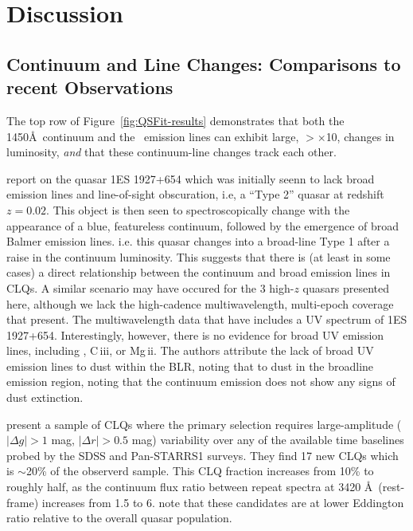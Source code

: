 \documentclass[fleqn,usenatbib]{mnras}
\begin{document}
\section{Discussion}
\subsection{Continuum and Line Changes: Comparisons to recent Observations}
The top row of Figure~\ref{fig:QSFit-results} demonstrates that
both the 1450\AA\ continuum and the \civ\ emission lines can
exhibit large, $>$$\times$10, changes in luminosity, {\it and}
that these continuum-line changes track each other. 

\citet{Trakhtenbrot2019} report on the quasar 1ES 1927+654 which was
initially seenn to lack broad emission lines and line-of-sight
obscuration, i.e, a ``Type 2'' quasar at redshift $z=0.02$. This
object is then seen to spectroscopically change with the appearance of
a blue, featureless continuum, followed by the emergence of broad
Balmer emission lines.  i.e. this quasar changes into a broad-line
Type 1 after a raise in the continuum luminosity.  This suggests that
there is (at least in some cases) a direct relationship between the continuum
and broad emission lines in CLQs.  A similar scenario may have occured
for the 3 high-$z$ quasars presented here, although we lack the
high-cadence multiwavelength, multi-epoch coverage that
\citet{Trakhtenbrot2019} present.  The multiwavelength data that
\citet{Trakhtenbrot2019} have includes a UV spectrum of 1ES 1927+654.
Interestingly, however, there is no evidence for broad UV emission lines, including
\civ, C\,{\sc iii}, or Mg\,{\sc ii}.  The authors attribute the lack of broad UV
emission lines to dust within the BLR, noting that to dust in the
broadline emission region, noting that the continuum emission does not
show any signs of dust extinction.

\citet{MacLeod2019} present a sample of CLQs where the primary
selection requires large-amplitude ($| \Delta g | > 1$ mag, $| \Delta
r | > 0.5$ mag) variability over any of the available time baselines
probed by the SDSS and Pan-STARRS1 surveys. They find 17 new CLQs
which is $\sim$20\% of the observerd sample. This CLQ fraction
increases from 10\% to roughly half, as the continuum flux ratio
between repeat spectra at 3420 \AA\ (rest-frame) increases from 1.5 to
6. \citet{MacLeod2019} note that these candidates are at lower Eddington
ratio relative to the overall quasar population.
\end{document}
